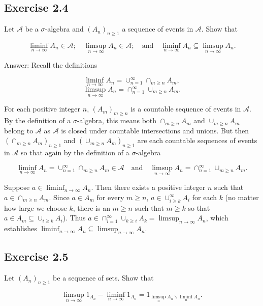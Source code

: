 \documentclass{article}
\begin{document}
\subsection*{Exercise 2.4}

Let $\mathcal{A}$ be a $\sigma$-algebra and $(A_n)_{n\geq 1}$ a sequence of events in $\mathcal{A}$. Show that

$$\liminf_{n\rightarrow \infty} A_n \in \mathcal{A}; \quad \limsup_{n\rightarrow \infty} A_n \in \mathcal{A}; \quad \text{and} \quad \liminf_{n\rightarrow \infty} A_n \subseteq \limsup_{n\rightarrow \infty} A_n.$$

Answer: Recall the definitions

$$
\liminf_{n\rightarrow \infty} A_n = \cup_{n=1}^\infty \cap_{m \geq n} A_m,
$$
$$
\limsup_{n\rightarrow \infty} A_n = \cap_{n=1}^\infty \cup_{m \geq n} A_m.
$$

For each positive integer $n$, $(A_m)_{m\geq n}$ is a countable sequence of events in $\mathcal{A}$. By the definition of a $\sigma$-algebra, this means both $\cap_{m\geq n} A_m$ and $\cup_{m\geq n} A_m$ belong to $\mathcal{A}$ as $\mathcal{A}$ is closed under countable intersections and unions. But then $(\cap_{m\geq n} A_m)_{n \geq 1}$ and $(\cup_{m\geq n} A_m)_{n\geq 1}$ are each countable sequences of events in $\mathcal{A}$ so that again by the definition of a $\sigma$-algebra

$$
\liminf_{n\rightarrow \infty} A_n = \cup_{n=1}^\infty \cap_{m \geq n} A_m \in \mathcal{A} \quad \text{and} \quad \limsup_{n\rightarrow \infty} A_n = \cap_{n=1}^\infty \cup_{m \geq n} A_m.
$$

Suppose $a \in \liminf_{n\rightarrow \infty} A_n$. Then there exists a positive integer $n$ such that $a \in \cap_{m\geq n} A_m$. Since $a \in A_m$ for every $m \geq n$, $a \in \cup_{i\geq k}^\infty A_i$ for each $k$ (no matter how large we choose $k$, there is an $m \geq n$ such that $m \geq k$ so that $a \in A_m \subseteq \cup_{i\geq k} A_i$). Thus $a \in \cap_{i=1}^\infty \cup_{k\geq i} A_k = \limsup_{n \rightarrow \infty} A_n$, which establishes $\liminf_{n\rightarrow \infty} A_n \subseteq \limsup_{n\rightarrow \infty} A_n$. 

\subsection*{Exercise 2.5} 

Let $(A_n)_{n \geq 1}$ be a sequence of sets. Show that

$$
\limsup_{n\rightarrow \infty} 1_{A_n} - \liminf_{n\rightarrow \infty} 1_{A_n}
= 1_{\limsup_n A_n \backslash \liminf_n A_n}.
$$
\end{document}
